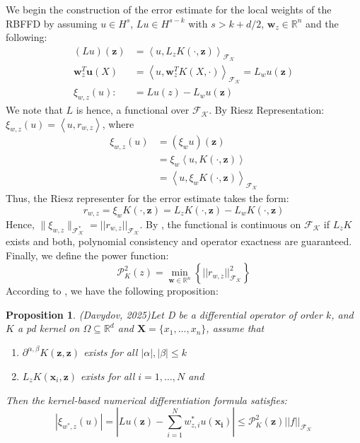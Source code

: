 \documentclass[11pt]{article}
\newtheorem{proposition}{Proposition}
\begin{document}
We begin the construction of the error estimate for the local weights of the RBFFD by assuming $u \in H^s$, $Lu \in H^{s-k}$ with $s > k + d/2$, $\bm{w}_z \in \mathbb{R}^n$ and the following:
\begin{align*}
	(Lu)(\bm{z}) &= \left\langle u, L_z K(\cdot, \bm{z}) \right\rangle_{\mathcal{F_K}}\\
	\bm{w}^T_z \bm{u}(X) &= \left\langle u, \bm{w}^T_z K(X,\cdot) \right\rangle_{\mathcal{F_K}} = L_w u(\bm{z})\\
	\xi_{w,z}(u) :&= Lu(z) - L_w u(\bm{z})
\end{align*}
We note that $L$ is hence, a functional over $\mathcal{F_K}$. By Riesz Representation: $\xi_{w,z}(u) = \left \langle u, r_{w,z} \right \rangle$, where
\begin{align*}
	\xi_{w,z}(u) &= (\xi_{w}u)(\bm{z})\\
	&= \xi_w \left \langle u, K(\cdot, \bm{z}) \right \rangle\\
	&= \left \langle u, \xi_w K(\cdot, \bm{z}) \right \rangle_{\mathcal{F_K}}
\end{align*}
Thus, the Riesz representer for the error estimate takes the form:
\begin{equation}
	r_{w,z} = \xi_w K(\cdot, \bm{z}) = L_z K(\cdot, \bm{z}) - L_w K(\cdot, \bm{z})
\end{equation}
Hence, $\| \xi_{w,z} \|_\mathcal{F_K^*} = ||r_{w,z}||_\mathcal{F_K}$. By \cite{Davydov2025}, the functional is continuous on $\mathcal{F_K}$ if $L_zK$ exists and both, polynomial consistency and operator exactness are guaranteed. Finally, we define the power function:
\begin{equation}
\mathcal{P}_{K}^2(z) = \min_{\bm{w} \in \mathbb{R}^n} \left \{||r_{w,z}||_\mathcal{F_K}^2 \right \}
\end{equation}
According to \cite{Davydov2025}, we have the following proposition:
\begin{proposition}
(Davydov, 2025)Let D be a differential operator of order $k$, and $K$ a pd kernel on $\Omega \subseteq \mathbb{R}^d$ and $\bm{X}=\{ x_1, \dots, x_n\}$, assume that
\begin{enumerate}
\item
$\partial^{\alpha,\beta}K(\bm{z},\bm{z})$ exists for all $|\alpha|, |\beta| \le k$
\item
$L_zK(\bm{x}_i,\bm{z})$ exists for all $i=1,\dots,N$ and
\end{enumerate}
Then the kernel-based numerical differentiation formula  satisfies:
\begin{equation}
\left| \xi_{w^*,z}(u) \right| = \left| Lu(\bm{z}) -\sum_{i=1}^N w_{z,i}^*u(\bm{x_i}) \right| \le \mathcal{P}_{K}^2(\bm{z}) ||f||_\mathcal{F_K}
\end{equation}
\end{proposition}
\end{document}
